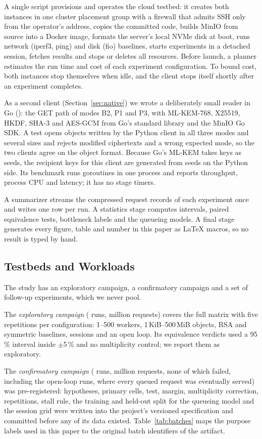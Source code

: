 \documentclass[review,12pt]{elsarticle}
\begin{document}
A single script provisions and operates the cloud testbed: it creates both instances in one
cluster placement group with a firewall that admits SSH only from the operator's address, copies
the committed code, builds MinIO from source into a Docker image, formats the server's local NVMe
disk at boot, runs network (iperf3, ping) and disk (fio) baselines, starts experiments in a
detached session, fetches results and stops or deletes all resources. Before launch, a planner
estimates the run time and cost of each experiment configuration. To bound cost, both instances
stop themselves when idle, and the client stops itself shortly after an experiment completes.

As a second client (Section~\ref{sec:native}) we wrote a deliberately small reader in
Go (\AudNGo): the GET path of modes B2, P1 and P3, with ML-KEM-768, X25519, HKDF, SHA-3 and
AES-GCM from Go's standard library and the MinIO Go SDK. A test opens objects written by the
Python client in all three modes and several sizes and rejects modified ciphertexts and a wrong
expected mode, so the two clients agree on the object format. Because Go's ML-KEM takes keys
as seeds, the recipient keys for this client are generated from seeds on the Python side. Its
benchmark runs goroutines in one process and reports throughput, process CPU and latency; it
has no stage timers.

A summarizer streams the compressed request records of each experiment once and writes one row
per run. A statistics stage computes intervals, paired equivalence tests, bottleneck labels and
the queueing models. A final stage generates every figure, table and number in this paper as
\LaTeX{} macros, so no result is typed by hand.

\subsection{Testbeds and Workloads}\label{sec:campaigns}
The study has an exploratory campaign, a confirmatory campaign and a set of follow-up
experiments, which we never pool.

The \emph{exploratory campaign} (\TotalRuns{} runs, \TotalRequestsM{} million
requests) covers the full matrix with five repetitions per configuration: 1--500 workers,
1\,KiB--500\,MiB objects, RSA and symmetric baselines, sessions and an open loop. Its equivalence
verdicts used a 95\,\% interval inside $\pm$5\,\% and no multiplicity control; we report them as
exploratory.

The \emph{confirmatory campaign} (\RevAllRuns{} runs, \RevAllRequests{} million
requests, none of which failed, including the \RevOpenRuns{} open-loop runs, where every queued
request was eventually served) was pre-registered: hypotheses, primary cells, test, margin,
multiplicity correction, repetitions, stall rule, the training and held-out split for the
queueing model and the session grid were written into the project's versioned specification and
committed before any of its data existed. Table~\ref{tab:batches} maps the purpose labels used
in this paper to the original batch identifiers of the artifact.
\end{document}
